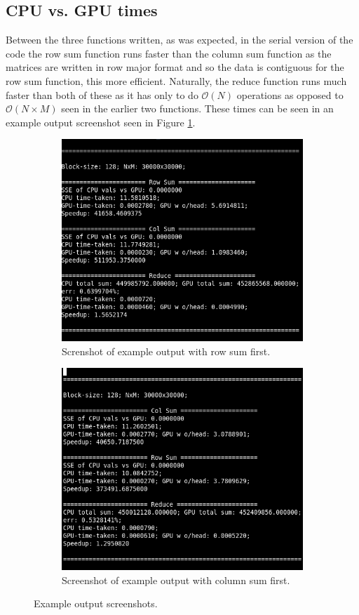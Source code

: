 \documentclass[12pt]{article}
\begin{document}
\subsection*{CPU vs. GPU times}
    Between the three functions written, as was expected, in the serial version of the code the row sum function runs faster than the column sum function as the matrices are written in row major format and so the data is contiguous for the row sum function, this more efficient. Naturally, the reduce function runs much faster than both of these as it has only to do $\mathcal{O}(N)$ operations as opposed to $\mathcal{O}(N\times M)$ seen in the earlier two functions. These times can be seen in an example output screenshot seen in Figure \ref{fig:rowout}.\\
    \begin{figure}
        \centering
        \begin{subfigure}{0.48\textwidth}
            \centering
            \includegraphics[width=0.75\linewidth]{rowScreen.png}
            \caption{Screnshot of example output with row sum first.}
            \label{fig:rowout}
        \end{subfigure}
        \begin{subfigure}{0.48\textwidth}
            \centering
            \includegraphics[width=0.75\linewidth]{colScreen.png}
            \caption{Screenshot of example output with column sum first.}
            \label{fig:colout}
        \end{subfigure}
        \caption{Example output screenshots.}
    \end{figure}
\end{document}
